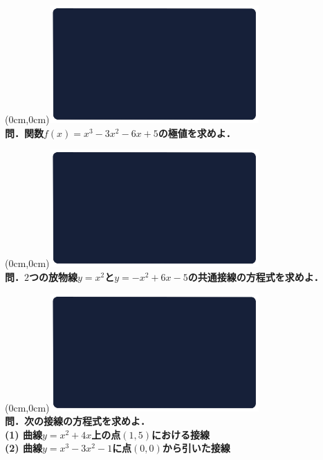 \documentclass[10pt,
fleqn,
dvipdfmx,
uplatex
]{jsarticle}
\begin{document}
\newpage



\at(0cm,0cm){\includegraphics[width=8cm,bb=0 0 1920 1080]{./media_local/smart_background/数II微積.jpeg}}
\vspace{0.3zw}\\
\noindent\Large 
\bf\boldmath 問．関数$f\left(x\right)=x^3-3x^2-6x+5$の極値を求めよ．


\newpage



\at(0cm,0cm){\includegraphics[width=8cm,bb=0 0 1920 1080]{./media_local/smart_background/数II微積.jpeg}}
\vspace{0.3zw}\\
\noindent\Large 
\bf\boldmath 問．$2$つの放物線$y=x^2$と$y=-x^2+6x-5$の共通接線の方程式を求めよ．


\newpage



\at(0cm,0cm){\includegraphics[width=8cm,bb=0 0 1920 1080]{./media_local/smart_background/数II微積.jpeg}}
\vspace{0.3zw}\\
\noindent\large 
\bf\boldmath 問．次の接線の方程式を求めよ．\\
(1)  曲線$y=x^2+4x$上の点$\left(1,5\right)$における接線\\
(2)  曲線$y=x^3-3x^2-1$に点$\left(0,0\right)$から引いた接線\\
\end{document}
